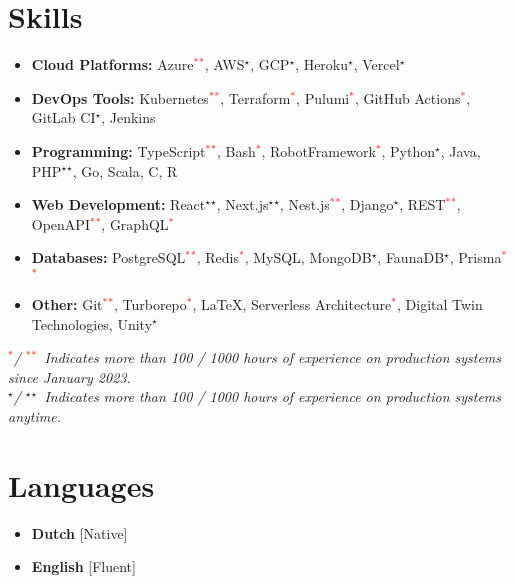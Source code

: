\section{Skills}
{
	\newcommand{\skilled}{\textcolor{black}{$^\star$}}
	\newcommand{\sskilled}{\skilled\skilled}
	\newcommand{\skilledRecent}{\textcolor{red}{$^*$}}
	\newcommand{\sskilledRecent}{\skilledRecent\skilledRecent}
			
	\begin{itemize}[label=\textbullet]
		\item {\textbf{Cloud Platforms:} Azure\sskilledRecent, AWS\skilled, GCP\skilled, Heroku\skilled, Vercel\skilled}
		\item {\textbf{DevOps Tools:} Kubernetes\sskilledRecent, Terraform\skilledRecent, Pulumi\skilledRecent, GitHub Actions\skilledRecent, GitLab CI\skilled, Jenkins}
		\item {\textbf{Programming:} TypeScript\sskilledRecent, Bash\skilledRecent, RobotFramework\skilledRecent, Python\skilled, Java, PHP\sskilled, Go, Scala, C, R}
		\item {\textbf{Web Development:} React\sskilled, Next.js\sskilled, Nest.js\sskilledRecent, Django\skilled, REST\sskilledRecent, OpenAPI\sskilledRecent, GraphQL\skilledRecent}
		\item {\textbf{Databases:} PostgreSQL\sskilledRecent, Redis\skilledRecent, MySQL, MongoDB\skilled, FaunaDB\skilled, Prisma\sskilledRecent}
		\item {\textbf{Other:} Git\sskilledRecent, Turborepo\skilledRecent, LaTeX, Serverless Architecture\skilledRecent, Digital Twin Technologies, Unity\skilled}
	\end{itemize}
	{\footnotesize%
		\vspace{-2mm}%
		\emph{%
			\hspace*{4mm}\skilledRecent / \sskilledRecent~Indicates more than 100 / 1000 hours of experience on production systems since January 2023.
			} \\
		\emph{%
			\hspace*{4mm}\skilled / \sskilled~Indicates more than 100 / 1000 hours of experience on production systems anytime.}
	}
			        
}
    

\Needspace{3cm} %
\section{Languages}{
 \begin{multicols}{2}
 	\begin{itemize}[label=\textbullet]
 		\item \textbf{Dutch} [Native]
 		\item \textbf{English} [Fluent]
 	\end{itemize}
 \end{multicols}
}

